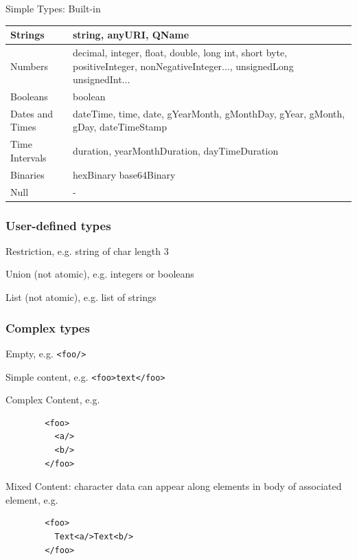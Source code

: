 \documentclass[11pt,oneside,a4paper]{article}
\begin{document}
Simple Types: Built-in

\begin{tabular}{|l|p{150mm}|}
	\hline 
	Strings & string, anyURI, QName \\ 
	\hline 
	Numbers & decimal, integer, float, double, long int, short byte, positiveInteger, \newline nonNegativeInteger..., unsignedLong unsignedInt... \\ 
	\hline 
	Booleans & boolean \\ 
	\hline 
	Dates and Times & dateTime, time, date, gYearMonth, gMonthDay, gYear, gMonth, gDay, dateTimeStamp \\ 
	\hline 
	Time Intervals & duration, yearMonthDuration, dayTimeDuration \\ 
	\hline 
	Binaries & hexBinary base64Binary \\ 
	\hline 
	Null & - \\ 
	\hline 
\end{tabular} 

\subsubsection{User-defined types}

\begin{compactitem}
	\item Restriction, e.g. string of char length 3
	\item Union (not atomic), e.g. integers or booleans
	\item List (not atomic), e.g. list of strings
\end{compactitem}

\subsubsection{Complex types}

\begin{compactitem}
	\item Empty, e.g. \verb|<foo/>|
	\item Simple content, e.g. \verb|<foo>text</foo>|
	\item Complex Content, e.g.
	\begin{verbatim}
		<foo>
		  <a/>
		  <b/>
		</foo>
	\end{verbatim}
	\item Mixed Content: character data can appear along elements in body of associated element, e.g.
	\begin{verbatim}
		<foo>
		  Text<a/>Text<b/>
		</foo>
	\end{verbatim}
\end{compactitem}
\end{document}
